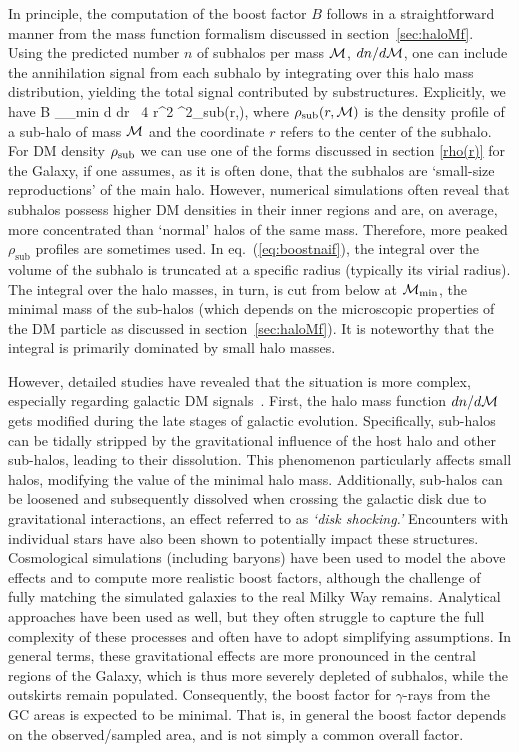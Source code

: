\medskip
In principle, the computation of the boost factor $B$ follows in a straightforward manner from the mass function formalism discussed in section~\ref{sec:haloMf}. Using 
the predicted number $n$ of subhalos per mass ${\mathcal{M}}$, $dn/d{\mathcal{M}}$, 
one can include the annihilation signal from each subhalo by integrating over this halo mass distribution, yielding the total signal contributed by substructures. Explicitly, we have
\beq
\label{eq:boostnaif}
B \propto \int_{\Mcal_{\rm min}} d\Mcal {} \int dr \ 4 \pi r^2 \rho^2_{\rm sub}(r,\Mcal),
\eeq
where $\rho_{\rm sub}(r,{\mathcal{M}})$ is the density profile of a sub-halo of mass ${\mathcal{M}}$ and the coordinate $r$ refers to the center of the subhalo. 
For DM density $\rho_{\rm sub}$ we can use one of the forms  discussed in section \ref{rho(r)} for the Galaxy, if one assumes, as it is often done, that the subhalos are `small-size reproductions' of the main halo. 
However, numerical simulations often reveal that subhalos possess higher DM densities in their inner regions and are, on average, more concentrated than `normal' halos of the same mass.
Therefore, more peaked $\rho_{\text{{sub}}}$ profiles are sometimes used.  
In eq.~(\ref{eq:boostnaif}), the integral over the volume of the subhalo is truncated at a specific radius  (typically its virial radius). 
The integral over the halo masses, in turn, is cut from below at ${\mathcal{M}}_{\rm min}$, the minimal mass of the sub-halos (which depends on the microscopic properties of the DM particle as discussed in section~\ref{sec:haloMf}).
It is noteworthy that the integral is primarily dominated by small halo masses.

\smallskip



However, detailed studies have revealed that the situation is more complex, especially regarding galactic DM signals~\cite{BoostFactorID2}.
First, the halo mass function $dn/d{\mathcal{M}}$ 
gets modified during the late stages of galactic evolution.
 Specifically, sub-halos can be tidally stripped by the gravitational influence of the host halo and other sub-halos, leading to their dissolution.
 This phenomenon particularly affects small halos, modifying the value of the 
 minimal halo mass.
Additionally, sub-halos can be loosened and subsequently dissolved when crossing the galactic disk due to gravitational interactions, an effect referred to as {\em `disk shocking.' }
Encounters with individual stars have also been shown to potentially impact these structures.
Cosmological simulations (including baryons) have been used to model the above effects and to compute more realistic boost factors, although the challenge of  fully matching the simulated galaxies to the real Milky Way remains. 
Analytical approaches have been used as well, but they often struggle to capture the full complexity of these processes and often have to adopt simplifying assumptions. 
In general terms, these gravitational effects are more pronounced in the central regions of the Galaxy, which is thus more severely depleted of subhalos, while the outskirts remain populated. 
Consequently, the boost factor for $\gamma$-rays from the GC areas is expected to be minimal.
That is, in general the boost factor depends on the observed/sampled area, and is not simply a common overall factor. 

